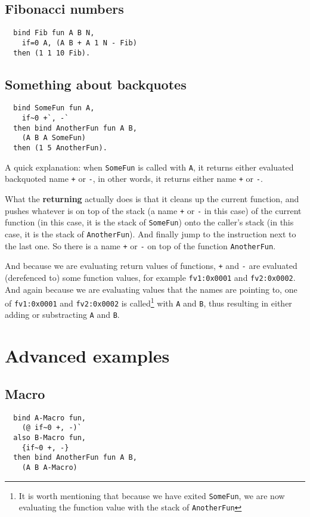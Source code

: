 \documentclass{book}
\begin{document}
\subsection{Fibonacci numbers}
\begin{verbatim}
  bind Fib fun A B N,
    if=0 A, (A B + A 1 N - Fib)
  then (1 1 10 Fib).
\end{verbatim}

\subsection{Something about backquotes}
\begin{verbatim}
  bind SomeFun fun A,
    if~0 +`, -`
  then bind AnotherFun fun A B,
    (A B A SomeFun)
  then (1 5 AnotherFun).
\end{verbatim}

A quick explanation: when \texttt{SomeFun} is called with \texttt{A}, it returns either evaluated backquoted name \texttt{+} or \texttt{-}, in other words, it returns either name \texttt{+} or \texttt{-}.

What the \textbf{returning} actually does is that it cleans up the current function, and pushes whatever is on top of the stack (a name \texttt{+} or \texttt{-} in this case) of the current function (in this case, it is the stack of \texttt{SomeFun}) onto the caller's stack (in this case, it is the stack of \texttt{AnotherFun}). And finally jump to the instruction next to the last one. So there is a name \texttt{+} or \texttt{-} on top of the function \texttt{AnotherFun}.

And because we are evaluating return values of functions, \texttt{+} and \texttt{-} are evaluated (derefenced to) some function values, for example \texttt{fv1:0x0001} and \texttt{fv2:0x0002}. And again because we are evaluating values that the names are pointing to, one of \texttt{fv1:0x0001} and \texttt{fv2:0x0002} is called\footnote{It is worth mentioning that because we have exited \texttt{SomeFun}, we are now evaluating the function value with the stack of \texttt{AnotherFun}} with \texttt{A} and \texttt{B}, thus resulting in either adding or substracting \texttt{A} and \texttt{B}.

\section{Advanced examples}
\subsection{Macro}
\begin{verbatim}
  bind A-Macro fun,
    (@ if~0 +, -)`
  also B-Macro fun,
    {if~0 +, -}
  then bind AnotherFun fun A B,
    (A B A-Macro)
\end{verbatim}
\end{document}
